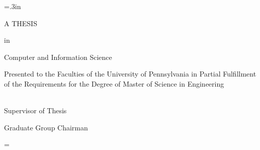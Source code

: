 \large\newlength{\oldparskip}\setlength\oldparskip{\parskip}\parskip=.3in
\thispagestyle{empty} \doublespaced
\begin{center}
\vspace*{\fill} \thetitle

\theauthor


A THESIS

in

Computer and Information Science

\large Presented to the Faculties of the University of
Pennsylvania in Partial
 Fulfillment of the Requirements for the Degree of Master of
 Science in Engineering

\large
\theyear
\end{center}


\noindent\makebox [0in][l]{\rule[2ex]{3in}{.3mm}} 
\theadvisor \singlespaced \\
Supervisor of Thesis



\noindent\makebox[0in][l]{\rule[2ex]{3in}{.3mm}} Graduate Group
Chairman \vspace*{\fill}

\normalsize\parskip=\oldparskip

